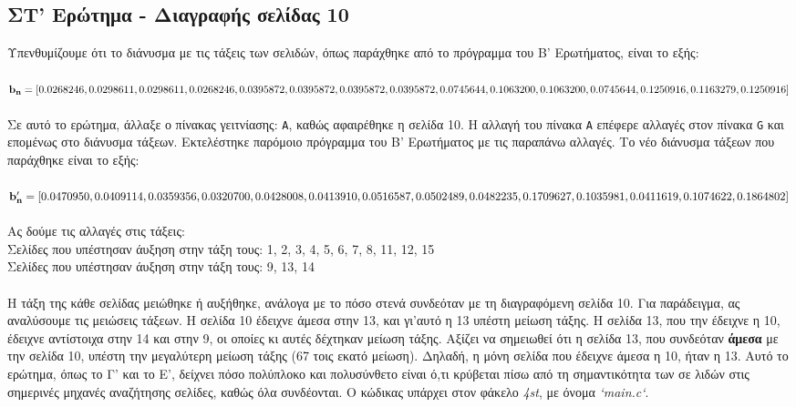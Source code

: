 \documentclass[a4paper, 14pt]{article}   %
\begin{document}
\subsection*{ΣΤ' Ερώτημα - Διαγραφής σελίδας 10}  %
Υπενθυμίζουμε ότι το διάνυσμα με τις τάξεις των σελιδών, όπως παράχθηκε από το πρόγραμμα του Β' Ερωτήματος, είναι το εξής:\\\\
$\mathbf{b_n} = [0.0268246, 0.0298611, 0.0298611, 0.0268246, 0.0395872, 0.0395872, 0.0395872,\\ 0.0395872, 0.0745644, 0.1063200, 0.1063200, 0.0745644, 0.1250916, 0.1163279,  0.1250916]$\\\\
Σε αυτό το ερώτημα, άλλαξε ο πίνακας γειτνίασης: \texttt{A}, καθώς αφαιρέθηκε η σελίδα 10. Η αλλαγή του πίνακα \texttt{A} επέφερε αλλαγές στον πίνακα \texttt{G} και επομένως στο διάνυσμα τάξεων. Εκτελέστηκε παρόμοιο πρόγραμμα του Β' Ερωτήματος με τις παραπάνω αλλαγές. Το νέο διάνυσμα τάξεων που παράχθηκε είναι το εξής:\\\\
$\mathbf{b'_n} = [0.0470950, 0.0409114, 0.0359356, 0.0320700, 0.0428008, 0.0413910, 0.0516587,\\ 0.0502489, 0.0482235, 0.1709627, 0.1035981,  0.0411619, 0.1074622, 0.1864802]$\\\\
Ας δούμε τις αλλαγές στις τάξεις:\\
Σελίδες που υπέστησαν άυξηση στην τάξη τους: 1, 2, 3, 4, 5, 6, 7, 8, 11, 12, 15\\
Σελίδες που υπέστησαν άυξηση στην τάξη τους: 9, 13, 14\\\\
Η τάξη της κάθε σελίδας μειώθηκε ή αυξήθηκε, ανάλογα με το πόσο στενά συνδεόταν με τη διαγραφόμενη σελίδα 10. Για παράδειγμα, ας αναλύσουμε τις μειώσεις τάξεων. Η σελίδα 10 έδειχνε άμεσα στην 13, και γι'αυτό η 13 υπέστη μείωση τάξης. Η σελίδα 13, που την έδειχνε η 10, έδειχνε αντίστοιχα στην 14 και στην 9, οι οποίες κι αυτές δέχτηκαν μείωση τάξης. Αξίζει να σημειωθεί ότι η σελίδα 13, που συνδεόταν \textbf{άμεσα} με την σελίδα 10, υπέστη την μεγαλύτερη μείωση τάξης (67 τοις εκατό μείωση). Δηλαδή, η μόνη σελίδα που έδειχνε άμεσα η 10, ήταν η 13. Αυτό το ερώτημα, όπως το Γ' και το Ε', δείχνει πόσο πολύπλοκο και πολυσύνθετο είναι ό,τι κρύβεται πίσω από τη σημαντικότητα των σε λιδών στις σημερινές μηχανές αναζήτησης σελίδες, καθώς όλα συνδέονται. Ο κώδικας υπάρχει στον φάκελο \emph{4st}, με όνομα \emph{`main.c`}.\\\\\\
\end{document}
